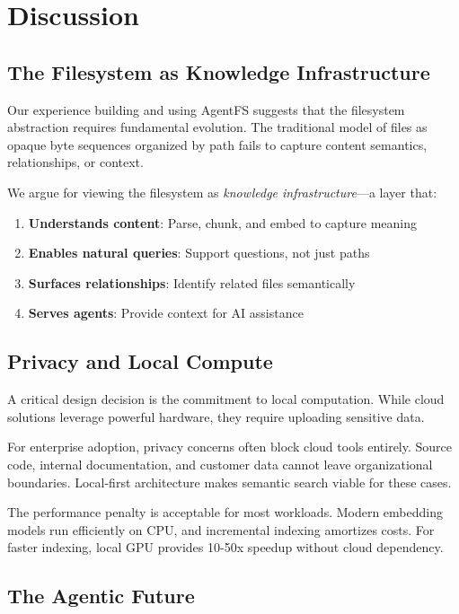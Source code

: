 \documentclass[conference]{IEEEtran}
\begin{document}
\section{Discussion}

\subsection{The Filesystem as Knowledge Infrastructure}

Our experience building and using AgentFS suggests that the filesystem abstraction requires fundamental evolution. The traditional model of files as opaque byte sequences organized by path fails to capture content semantics, relationships, or context.

We argue for viewing the filesystem as \textit{knowledge infrastructure}---a layer that:

\begin{enumerate}
    \item \textbf{Understands content}: Parse, chunk, and embed to capture meaning
    \item \textbf{Enables natural queries}: Support questions, not just paths
    \item \textbf{Surfaces relationships}: Identify related files semantically
    \item \textbf{Serves agents}: Provide context for AI assistance
\end{enumerate}

\subsection{Privacy and Local Compute}

A critical design decision is the commitment to local computation. While cloud solutions leverage powerful hardware, they require uploading sensitive data.

For enterprise adoption, privacy concerns often block cloud tools entirely. Source code, internal documentation, and customer data cannot leave organizational boundaries. Local-first architecture makes semantic search viable for these cases.

The performance penalty is acceptable for most workloads. Modern embedding models run efficiently on CPU, and incremental indexing amortizes costs. For faster indexing, local GPU provides 10-50x speedup without cloud dependency.

\subsection{The Agentic Future}
\end{document}
